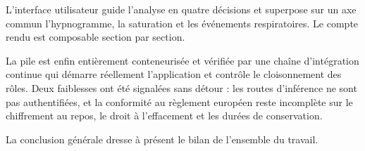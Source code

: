 L'interface utilisateur guide l'analyse en quatre décisions et superpose sur un axe
commun l'hypnogramme, la saturation et les événements respiratoires. Le compte rendu
est composable section par section.

La pile est enfin entièrement conteneurisée et vérifiée par une chaîne d'intégration
continue qui démarre réellement l'application et contrôle le cloisonnement des rôles.
Deux faiblesses ont été signalées sans détour : les routes d'inférence ne sont pas
authentifiées, et la conformité au règlement européen reste incomplète sur le
chiffrement au repos, le droit à l'effacement et les durées de conservation.

La conclusion générale dresse à présent le bilan de l'ensemble du travail.
